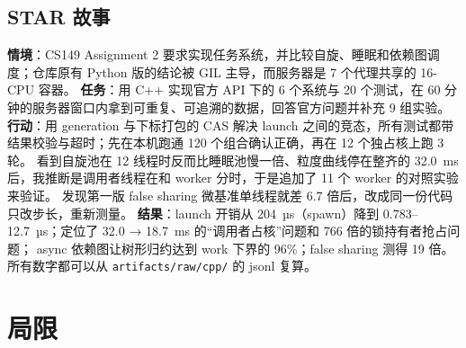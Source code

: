 \documentclass[11pt,a4paper]{ctexart}
\begin{document}
\subsection{STAR 故事}

\textbf{情境}：CS149 Assignment 2 要求实现任务系统，并比较自旋、睡眠和依赖图调度；仓库原有 Python 版的结论被 GIL 主导，而服务器是 7 个代理共享的 16-CPU 容器。
\textbf{任务}：用 C++ 实现官方 API 下的 6 个系统与 20 个测试，在 60 分钟的服务器窗口内拿到可重复、可追溯的数据，回答官方问题并补充 9 组实验。
\textbf{行动}：用 generation 与下标打包的 CAS 解决 launch 之间的竞态，所有测试都带结果校验与超时；先在本机跑通 120 个组合确认正确，再在 12 个独占核上跑 3 轮。
看到自旋池在 12 线程时反而比睡眠池慢一倍、粒度曲线停在整齐的 32.0~ms 后，我推断是调用者线程在和 worker 分时，于是追加了 11 个 worker 的对照实验来验证。
发现第一版 false sharing 微基准单线程就差 6.7 倍后，改成同一份代码只改步长，重新测量。
\textbf{结果}：launch 开销从 204~µs（spawn）降到 0.783--12.7~µs；定位了 32.0 → 18.7~ms 的``调用者占核''问题和 766 倍的锁持有者抢占问题；
async 依赖图让树形归约达到 work 下界的 96\%；false sharing 测得 19 倍。所有数字都可以从 \texttt{artifacts/raw/cpp/} 的 jsonl 复算。

\section{局限}
\label{sec:caveat}
\end{document}

